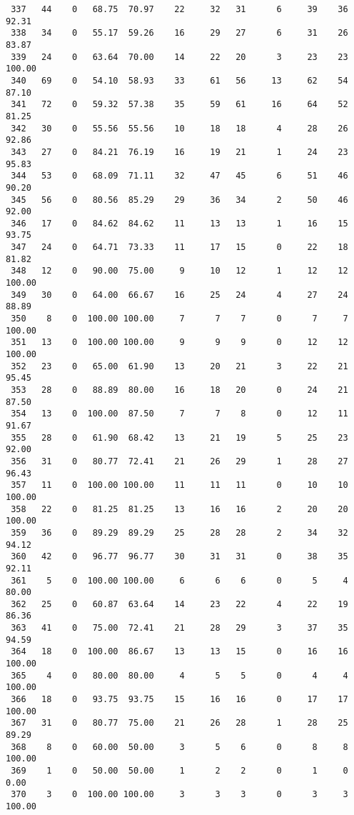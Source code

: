 \begin{verbatim}
 337   44    0   68.75  70.97    22     32   31      6     39    36    92.31
 338   34    0   55.17  59.26    16     29   27      6     31    26    83.87
 339   24    0   63.64  70.00    14     22   20      3     23    23   100.00
 340   69    0   54.10  58.93    33     61   56     13     62    54    87.10
 341   72    0   59.32  57.38    35     59   61     16     64    52    81.25
 342   30    0   55.56  55.56    10     18   18      4     28    26    92.86
 343   27    0   84.21  76.19    16     19   21      1     24    23    95.83
 344   53    0   68.09  71.11    32     47   45      6     51    46    90.20
 345   56    0   80.56  85.29    29     36   34      2     50    46    92.00
 346   17    0   84.62  84.62    11     13   13      1     16    15    93.75
 347   24    0   64.71  73.33    11     17   15      0     22    18    81.82
 348   12    0   90.00  75.00     9     10   12      1     12    12   100.00
 349   30    0   64.00  66.67    16     25   24      4     27    24    88.89
 350    8    0  100.00 100.00     7      7    7      0      7     7   100.00
 351   13    0  100.00 100.00     9      9    9      0     12    12   100.00
 352   23    0   65.00  61.90    13     20   21      3     22    21    95.45
 353   28    0   88.89  80.00    16     18   20      0     24    21    87.50
 354   13    0  100.00  87.50     7      7    8      0     12    11    91.67
 355   28    0   61.90  68.42    13     21   19      5     25    23    92.00
 356   31    0   80.77  72.41    21     26   29      1     28    27    96.43
 357   11    0  100.00 100.00    11     11   11      0     10    10   100.00
 358   22    0   81.25  81.25    13     16   16      2     20    20   100.00
 359   36    0   89.29  89.29    25     28   28      2     34    32    94.12
 360   42    0   96.77  96.77    30     31   31      0     38    35    92.11
 361    5    0  100.00 100.00     6      6    6      0      5     4    80.00
 362   25    0   60.87  63.64    14     23   22      4     22    19    86.36
 363   41    0   75.00  72.41    21     28   29      3     37    35    94.59
 364   18    0  100.00  86.67    13     13   15      0     16    16   100.00
 365    4    0   80.00  80.00     4      5    5      0      4     4   100.00
 366   18    0   93.75  93.75    15     16   16      0     17    17   100.00
 367   31    0   80.77  75.00    21     26   28      1     28    25    89.29
 368    8    0   60.00  50.00     3      5    6      0      8     8   100.00
 369    1    0   50.00  50.00     1      2    2      0      1     0     0.00
 370    3    0  100.00 100.00     3      3    3      0      3     3   100.00

\end{verbatim}
